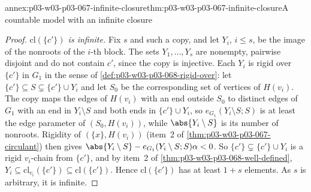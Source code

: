\begin{annexitem}{annex:p03-w03-p03-067-infinite-closure}{thm:p03-w03-p03-067-infinite-closure}{A countable model with an infinite closure}
\begin{proof}
\emph{\(\mathrm{cl}(\{c'\})\) is infinite.}  Fix \(s\) and such a copy, and
let \(Y_i\), \(i\leq s\), be the image of the nonroots of the \(i\)-th block.
The sets \(Y_1,\ldots,Y_s\) are nonempty, pairwise disjoint and do not
contain \(c'\), since the copy is injective.  Each \(Y_i\) is rigid over
\(\{c'\}\) in \(G_1\) in the sense of \cref{def:p03-w03-p03-068-rigid-over}:
let \(\{c'\}\subseteq S\subsetneq\{c'\}\cup Y_i\) and let \(S_0\) be the
corresponding set of vertices of \(H(v_i)\).  The copy maps the edges of
\(H(v_i)\) with an end outside \(S_0\) to distinct edges of \(G_1\) with an
end in \(Y_i\setminus S\) and both ends in \(\{c'\}\cup Y_i\), so
\(e_{G_1}(Y_i\setminus S;S)\) is at least the edge parameter of
\((S_0,H(v_i))\), while \(\abs{Y_i\setminus S}\) is its number of nonroots.
Rigidity of \((\{x\},H(v_i))\) (item~2 of
\cref{thm:p03-w03-p03-067-circulant}) then gives
\(\abs{Y_i\setminus S}-e_{G_1}(Y_i\setminus S;S)\alpha<0\).  So
\(\{c'\}\subsetneq\{c'\}\cup Y_i\) is a rigid \(v_i\)-chain from
\(\{c'\}\), and by item~2 of \cref{thm:p03-w03-p03-068-well-defined},
\(Y_i\subseteq\mathrm{cl}_{v_i}(\{c'\})\subseteq\mathrm{cl}(\{c'\})\).
Hence \(\mathrm{cl}(\{c'\})\) has at least \(1+s\) elements.  As \(s\) is
arbitrary, it is infinite.
\end{proof}
\end{annexitem}

